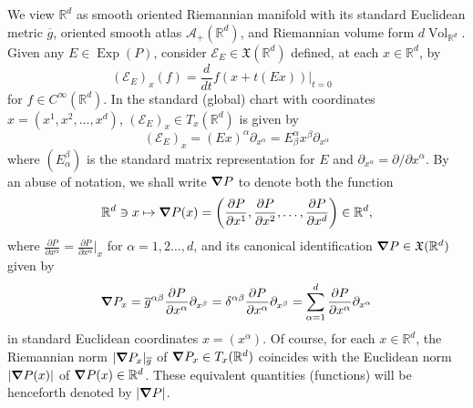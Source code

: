 \documentclass[11pt, letter]{book}
\newcommand\Exp{\operatorname{Exp}}
\newcommand{\Vol}{\operatorname{Vol}}
\begin{document}
\noindent We view $\mathbb{R}^d$ as smooth oriented Riemannian manifold with its standard Euclidean metric $\overline{g}$, oriented smooth atlas $\mathcal{A}_+(\mathbb{R}^d)$, and Riemannian volume form $ d\Vol_{\mathbb{R}^d}$. Given any $E\in\Exp(P)$, consider $\mathcal{E}_E\in \mathfrak{X}(\mathbb{R}^d)$ defined, at each $x\in\mathbb{R}^d$, by
\begin{equation*}
    (\mathcal{E}_E)_x(f)=\frac{d}{dt}f(x+t(Ex))\big\vert_{t=0}\hspace{1cm}
\end{equation*}
for $f\in C^\infty(\mathbb{R}^d)$. In the standard (global) chart with coordinates $x=(x^1,x^2,\dots,x^d)$, $(\mathcal{E}_E)_{x}\in T_{x}(\mathbb{R}^d)$ is given by
\begin{equation*}
    (\mathcal{E}_E)_{x}=(Ex)^{\alpha}\partial_{x^\alpha}=E^\alpha_\beta x^{\beta}\partial_{x^\alpha}
\end{equation*}
where $(E_\alpha^\beta)$ is the standard matrix representation for $E$ and  $\partial_{x^{\alpha}}=\partial/\partial x^\alpha$. By an abuse of notation, we shall write $\grad P$ to denote both the function
\begin{equation*}
\mathbb{R}^d\ni x\mapsto \grad P(x)=\left(\frac{\partial P}{\partial x^1},\frac{\partial P}{\partial x^2},\dots,\frac{\partial P}{\partial x^d}\right)\in\mathbb{R}^d,
\end{equation*}
where $\frac{\partial P}{\partial x^{\alpha}}=\frac{\partial P}{\partial x^{\alpha}}\vert_{x}$ for $\alpha=1,2\dots,d$, and its canonical identification $\grad P\in \mathfrak{X}(\mathbb{R}^d)$ given by \begin{equation*}
    \grad P_x=\overline{g}^{\alpha\beta}\frac{\partial P}{\partial x^{\alpha}}\partial_{x^{\beta}}=\delta^{\alpha\beta}\frac{\partial P}{\partial x^{\alpha}}\partial_{x^{\beta}}=\sum_{\alpha=1}^d\frac{\partial P}{\partial x^{\alpha}}\partial_{x^\alpha}
\end{equation*}
in standard Euclidean coordinates $x=(x^\alpha)$. Of course, for each $x\in\mathbb{R}^d$, the Riemannian norm $|\grad P_x |_{\overline{g}}$ of $\grad P_x \in T_x (\mathbb{R}^d)$ coincides with the Euclidean norm $| \grad P(x) |$ of $ \grad P(x) \in \mathbb{R}^d$. These equivalent quantities (functions) will be henceforth denoted by $|\grad P|$.
\end{document}
